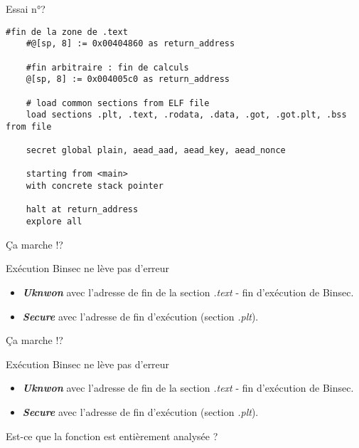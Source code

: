 \documentclass[A4,svgnames,9pt,aspectratio=169]{beamer}
\begin{document}
\begin{frame}[fragile]{Essai n°?}
  \begin{lstlisting}[style=INIStyle, caption={script.ini}, gobble=4]
    #fin de la zone de .text
    #@[sp, 8] := 0x00404860 as return_address
    
    #fin arbitraire : fin de calculs
    @[sp, 8] := 0x004005c0 as return_address
    
    # load common sections from ELF file
    load sections .plt, .text, .rodata, .data, .got, .got.plt, .bss from file
    
    secret global plain, aead_aad, aead_key, aead_nonce
    
    starting from <main>
    with concrete stack pointer
    
    halt at return_address
    explore all
  \end{lstlisting}
\end{frame}


\begin{frame}{Ça marche !?}

  \begin{block}{Exécution Binsec ne lève pas d'erreur}
        \begin{itemize}[<+->]
          \item \textit{\textbf{Uknwon}} avec l'adresse de fin de la section \textit{.text} - fin d'exécution de Binsec.
          \item \textit{\textbf{Secure}} avec l'adresse de fin d'exécution (section \textit{.plt}).
        \end{itemize}
  \vspace{1cm}
  \begin{center}
  \end{center}
  \end{block}
\end{frame}

\begin{frame}[noframenumbering]{Ça marche !?}

  \begin{block}{Exécution Binsec ne lève pas d'erreur}
        \begin{itemize}
          \item \textit{\textbf{Uknwon}} avec l'adresse de fin de la section \textit{.text} - fin d'exécution de Binsec.
          \item \textit{\textbf{Secure}} avec l'adresse de fin d'exécution (section \textit{.plt}).
        \end{itemize}
  \vspace{1cm}
  \begin{center}
    Est-ce que la fonction est entièrement analysée ?
  \end{center}
  \end{block}
\end{frame}
\end{document}
